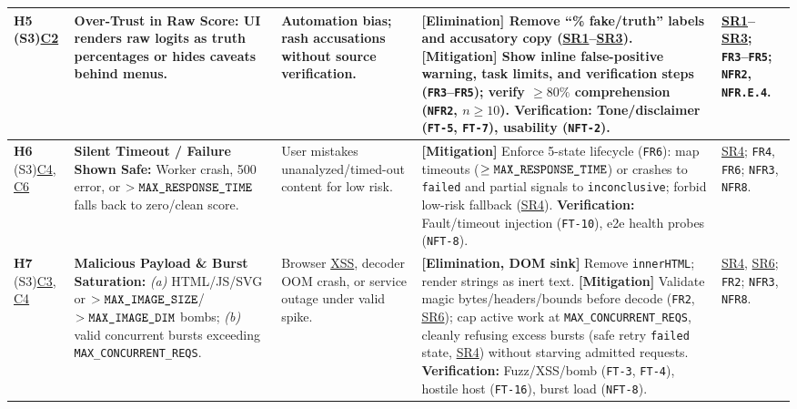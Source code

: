 \documentclass[11pt]{article}
\newcommand{\MaxResponseTime}{\texttt{MAX\_\allowbreak{}RESPONSE\_\allowbreak{}TIME}}
\newcommand{\MaxImageSize}{\texttt{MAX\_\allowbreak{}IMAGE\_\allowbreak{}SIZE}}
\newcommand{\MaxImageDim}{\texttt{MAX\_\allowbreak{}IMAGE\_\allowbreak{}DIM}}
\newcommand{\MaxConcurrentReqs}{\texttt{MAX\_\allowbreak{}CONCURRENT\_\allowbreak{}REQS}}
\newcommand{\XSS}{\hyperlink{ha-acr-xss}{XSS}}
\begin{document}
\begin{landscape}
\begin{tabularx}{\linewidth}{P{1.75cm} P{3.2cm} P{2.9cm} Y P{2.25cm}}
\label{haz:H5}\textbf{H5} (S3)\newline \hyperref[comp:C2]{C2} &
\textbf{Over-Trust in Raw Score:} UI renders raw logits as truth percentages or hides caveats behind menus. &
Automation bias; rash accusations without source verification. &
\textbf{[Elimination]} Remove ``\% fake/truth'' labels and accusatory copy (\hyperref[SR1]{SR1}--\hyperref[SR3]{SR3}).\newline
\textbf{[Mitigation]} Show inline false-positive warning, task limits, and verification steps (\texttt{FR3}--\texttt{FR5}); verify $\ge 80\%$ comprehension (\texttt{NFR2}, $n \ge 10$).\newline
\textbf{Verification:} Tone/disclaimer (\texttt{FT-5}, \texttt{FT-7}), usability (\texttt{NFT-2}). &
\hyperref[SR1]{SR1}--\hyperref[SR3]{SR3}; \texttt{FR3}--\texttt{FR5}; \texttt{NFR2}, \texttt{NFR.E.4}.\\
\midrule

\label{haz:H6}\textbf{H6} (S3)\newline \hyperref[comp:C4]{C4}, \hyperref[comp:C6]{C6} &
\textbf{Silent Timeout / Failure Shown Safe:} Worker crash, 500 error, or $> \MaxResponseTime{}$ falls back to zero/clean score. &
User mistakes unanalyzed/timed-out content for low risk. &
\textbf{[Mitigation]} Enforce 5-state lifecycle (\texttt{FR6}): map timeouts ($\ge \MaxResponseTime{}$) or crashes to \texttt{failed} and partial signals to \texttt{inconclusive}; forbid low-risk fallback (\hyperref[SR4]{SR4}).\newline
\textbf{Verification:} Fault/timeout injection (\texttt{FT-10}), e2e health probes (\texttt{NFT-8}). &
\hyperref[SR4]{SR4}; \texttt{FR4}, \texttt{FR6}; \texttt{NFR3}, \texttt{NFR8}.\\
\midrule

\label{haz:H7}\textbf{H7} (S3)\newline \hyperref[comp:C3]{C3}, \hyperref[comp:C4]{C4} &
\textbf{Malicious Payload \& Burst Saturation:} \emph{(a)} HTML/JS/SVG or $> \MaxImageSize{}$/$>\MaxImageDim{}$ bombs; \emph{(b)} valid concurrent bursts exceeding \MaxConcurrentReqs{}. &
Browser \XSS{}, decoder OOM crash, or service outage under valid spike. &
\textbf{[Elimination, DOM sink]} Remove \texttt{innerHTML}; render strings as inert text.\newline
\textbf{[Mitigation]} Validate magic bytes/headers/bounds before decode (\texttt{FR2}, \hyperref[SR6]{SR6}); cap active work at \MaxConcurrentReqs{}, cleanly refusing excess bursts (safe retry \texttt{failed} state, \hyperref[SR4]{SR4}) without starving admitted requests.\newline
\textbf{Verification:} Fuzz/XSS/bomb (\texttt{FT-3}, \texttt{FT-4}), hostile host (\texttt{FT-16}), burst load (\texttt{NFT-8}). &
\hyperref[SR4]{SR4}, \hyperref[SR6]{SR6}; \texttt{FR2}; \texttt{NFR3}, \texttt{NFR8}.\\
\midrule


\end{tabularx}
\end{landscape}
\end{document}

